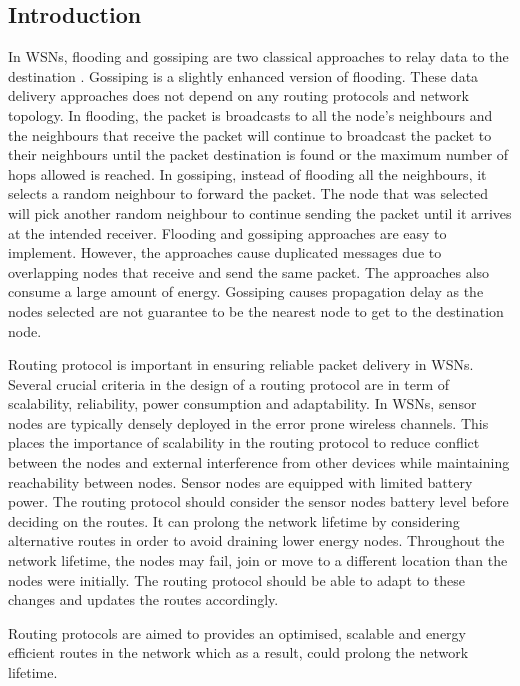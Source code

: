 \subsection{Introduction}
In WSNs, flooding and gossiping are two classical approaches to relay data to the destination \cite{akkaya2005survey}. Gossiping is a slightly enhanced version of flooding. These data delivery approaches does not depend on any routing protocols and network topology. In flooding, the packet is broadcasts to all the node's neighbours and the neighbours that receive the packet will continue to broadcast the packet to their neighbours until the packet destination is found or the maximum number of hops allowed is reached. In gossiping, instead of flooding all the neighbours, it selects a random neighbour to forward the packet. The node that was selected will pick another random neighbour to continue sending the packet until it arrives at the intended receiver. Flooding and gossiping approaches are easy to implement. However, the approaches cause duplicated messages due to overlapping nodes that receive and send the same packet. The approaches also consume a large amount of energy. Gossiping causes propagation delay as the nodes selected are not guarantee to be the nearest node to get to the destination node.

Routing protocol is important in ensuring reliable packet delivery in WSNs. Several crucial criteria in the design of a routing protocol are in term of scalability, reliability, power consumption and adaptability. In WSNs, sensor nodes are typically densely deployed in the error prone wireless channels. This places the importance of scalability in the routing protocol to reduce conflict between the nodes and external interference from other devices while maintaining reachability between nodes. Sensor nodes are equipped with limited battery power. The routing protocol should consider the sensor nodes battery level before deciding on the routes. It can prolong the network lifetime by considering alternative routes in order to avoid draining lower energy nodes. Throughout the network lifetime, the nodes may fail, join or move to a different location than the nodes were initially. The routing protocol should be able to adapt to these changes and updates the routes accordingly.

Routing protocols are aimed to provides an optimised, scalable and energy efficient routes in the network which as a result, could prolong the network lifetime.


